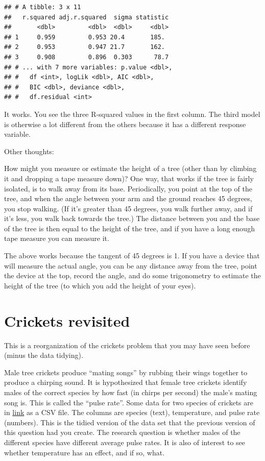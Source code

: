 \documentclass[]{tufte-book}
\theoremstyle{definition}
\theoremstyle{definition}
\theoremstyle{definition}
\theoremstyle{remark}
\begin{document}
\begin{verbatim}
## # A tibble: 3 x 11
##   r.squared adj.r.squared  sigma statistic
##       <dbl>         <dbl>  <dbl>     <dbl>
## 1     0.959         0.953 20.4       185. 
## 2     0.953         0.947 21.7       162. 
## 3     0.908         0.896  0.303      78.7
## # ... with 7 more variables: p.value <dbl>,
## #   df <int>, logLik <dbl>, AIC <dbl>,
## #   BIC <dbl>, deviance <dbl>,
## #   df.residual <int>
\end{verbatim}

It works. You see the three R-squared values in the first column. The
third model is otherwise a lot different from the others because it has
a different response variable.

Other thoughts:

How might you measure or estimate the height of a tree (other than by
climbing it and dropping a tape measure down)? One way, that works if
the tree is fairly isolated, is to walk away from its base.
Periodically, you point at the top of the tree, and when the angle
between your arm and the ground reaches 45 degrees, you stop walking.
(If it's greater than 45 degrees, you walk further away, and if it's
less, you walk back towards the tree.) The distance between you and the
base of the tree is then equal to the height of the tree, and if you
have a long enough tape measure you can measure it.

The above works because the tangent of 45 degrees is 1. If you have a
device that will measure the actual angle,
you can be any distance away from the tree, point the device at the top,
record the angle, and do some trigonometry to estimate the height of the
tree (to which you add the height of your eyes).

\hypertarget{crickets-revisited}{%
\section{Crickets revisited}\label{crickets-revisited}}

This is a reorganization of the crickets problem that you may have seen
before (minus the data tidying).

Male tree crickets produce ``mating songs'' by rubbing their wings
together to produce a chirping sound. It is hypothesized that female
tree crickets identify males of the correct species by how fast (in
chirps per second) the male's mating song is. This is called the ``pulse
rate''. Some data for two species of crickets are in
\href{http://www.utsc.utoronto.ca/~butler/c32/crickets2.csv}{link} as a
CSV file. The columns are species (text), temperature, and pulse rate
(numbers). This is the tidied version of the data set that the previous
version of this question had you create. The research question is
whether males of the different species have different average pulse
rates. It is also of interest to see whether temperature has an effect,
and if so, what.
\end{document}
